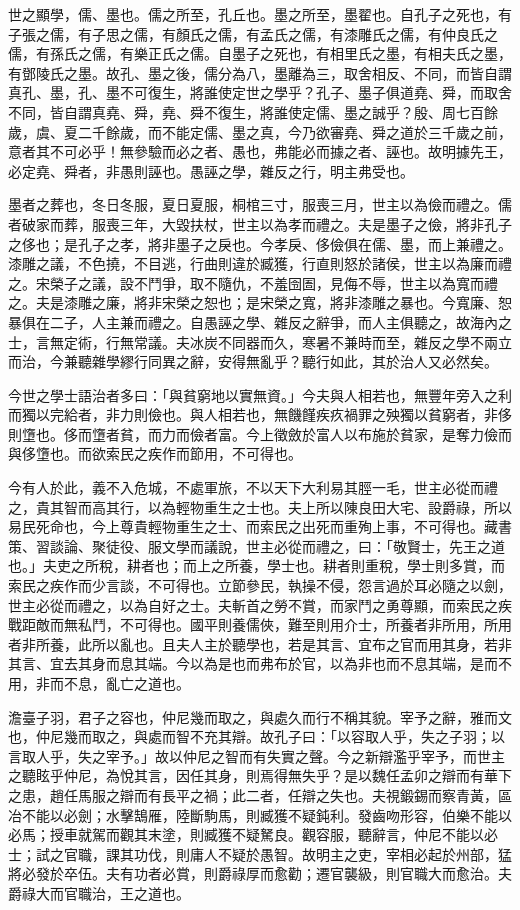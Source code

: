 
\begin{pinyinscope}
世之顯學，儒、墨也。儒之所至，孔丘也。墨之所至，墨翟也。自孔子之死也，有子張之儒，有子思之儒，有顏氏之儒，有孟氏之儒，有漆雕氏之儒，有仲良氏之儒，有孫氏之儒，有樂正氏之儒。自墨子之死也，有相里氏之墨，有相夫氏之墨，有鄧陵氏之墨。故孔、墨之後，儒分為八，墨離為三，取舍相反、不同，而皆自謂真孔、墨，孔、墨不可復生，將誰使定世之學乎？孔子、墨子俱道堯、舜，而取舍不同，皆自謂真堯、舜，堯、舜不復生，將誰使定儒、墨之誠乎？殷、周七百餘歲，虞、夏二千餘歲，而不能定儒、墨之真，今乃欲審堯、舜之道於三千歲之前，意者其不可必乎！無參驗而必之者、愚也，弗能必而據之者、誣也。故明據先王，必定堯、舜者，非愚則誣也。愚誣之學，雜反之行，明主弗受也。

墨者之葬也，冬日冬服，夏日夏服，桐棺三寸，服喪三月，世主以為儉而禮之。儒者破家而葬，服喪三年，大毀扶杖，世主以為孝而禮之。夫是墨子之儉，將非孔子之侈也；是孔子之孝，將非墨子之戾也。今孝戾、侈儉俱在儒、墨，而上兼禮之。漆雕之議，不色撓，不目逃，行曲則違於臧獲，行直則怒於諸侯，世主以為廉而禮之。宋榮子之議，設不鬥爭，取不隨仇，不羞囹圄，見侮不辱，世主以為寬而禮之。夫是漆雕之廉，將非宋榮之恕也；是宋榮之寬，將非漆雕之暴也。今寬廉、恕暴俱在二子，人主兼而禮之。自愚誣之學、雜反之辭爭，而人主俱聽之，故海內之士，言無定術，行無常議。夫冰炭不同器而久，寒暑不兼時而至，雜反之學不兩立而治，今兼聽雜學繆行同異之辭，安得無亂乎？聽行如此，其於治人又必然矣。

今世之學士語治者多曰：「與貧窮地以實無資。」今夫與人相若也，無豐年旁入之利而獨以完給者，非力則儉也。與人相若也，無饑饉疾疚禍罪之殃獨以貧窮者，非侈則墯也。侈而墯者貧，而力而儉者富。今上徵斂於富人以布施於貧家，是奪力儉而與侈墯也。而欲索民之疾作而節用，不可得也。

今有人於此，義不入危城，不處軍旅，不以天下大利易其脛一毛，世主必從而禮之，貴其智而高其行，以為輕物重生之士也。夫上所以陳良田大宅、設爵祿，所以易民死命也，今上尊貴輕物重生之士、而索民之出死而重殉上事，不可得也。藏書策、習談論、聚徒役、服文學而議說，世主必從而禮之，曰：「敬賢士，先王之道也。」夫吏之所稅，耕者也；而上之所養，學士也。耕者則重稅，學士則多賞，而索民之疾作而少言談，不可得也。立節參民，執操不侵，怨言過於耳必隨之以劍，世主必從而禮之，以為自好之士。夫斬首之勞不賞，而家鬥之勇尊顯，而索民之疾戰距敵而無私鬥，不可得也。國平則養儒俠，難至則用介士，所養者非所用，所用者非所養，此所以亂也。且夫人主於聽學也，若是其言、宜布之官而用其身，若非其言、宜去其身而息其端。今以為是也而弗布於官，以為非也而不息其端，是而不用，非而不息，亂亡之道也。

澹臺子羽，君子之容也，仲尼幾而取之，與處久而行不稱其貌。宰予之辭，雅而文也，仲尼幾而取之，與處而智不充其辯。故孔子曰：「以容取人乎，失之子羽；以言取人乎，失之宰予。」故以仲尼之智而有失實之聲。今之新辯濫乎宰予，而世主之聽眩乎仲尼，為悅其言，因任其身，則焉得無失乎？是以魏任孟卯之辯而有華下之患，趙任馬服之辯而有長平之禍；此二者，任辯之失也。夫視鍛錫而察青黃，區冶不能以必劍；水擊鵠雁，陸斷駒馬，則臧獲不疑鈍利。發齒吻形容，伯樂不能以必馬；授車就駕而觀其末塗，則臧獲不疑駑良。觀容服，聽辭言，仲尼不能以必士；試之官職，課其功伐，則庸人不疑於愚智。故明主之吏，宰相必起於州部，猛將必發於卒伍。夫有功者必賞，則爵祿厚而愈勸；遷官襲級，則官職大而愈治。夫爵祿大而官職治，王之道也。


\end{pinyinscope}

